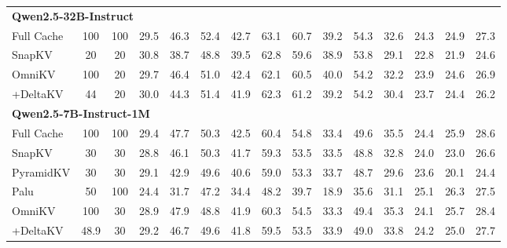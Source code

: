 \begin{table}[t]
{\begin{tabular}{l cc cccc cccc cccc}
\midrule
\multicolumn{15}{l}{\textbf{Qwen2.5-32B-Instruct}} \\
Full Cache & 100 & 100 & 29.5 & 46.3 & 52.4 & 42.7 & 63.1 & 60.7 & 39.2 & 54.3 & 32.6 & 24.3 & 24.9 & 27.3 \\
SnapKV & 20 & 20 & 30.8 & 38.7 & 48.8 & 39.5 & 62.8 & 59.6 & 38.9 & 53.8 & 29.1 & 22.8 & 21.9 & 24.6 \\
OmniKV & 100 & 20 & 29.7 & 46.4 & 51.0 & 42.4 & 62.1 & 60.5 & 40.0 & 54.2 & 32.2 & 23.9 & 24.6 & 26.9 \\
\quad +DeltaKV & 44 & 20 & 30.0 & 44.3 & 51.4 & 41.9 & 62.3 & 61.2 & 39.2 & 54.2 & 30.4 & 23.7 & 24.4 & 26.2 \\
\midrule
\multicolumn{15}{l}{\textbf{Qwen2.5-7B-Instruct-1M}} \\
Full Cache & 100 & 100 & 29.4 & 47.7 & 50.3 & 42.5 & 60.4 & 54.8 & 33.4 & 49.6 & 35.5 & 24.4 & 25.9 & 28.6 \\
SnapKV & 30 & 30 & 28.8 & 46.1 & 50.3 & 41.7 & 59.3 & 53.5 & 33.5 & 48.8 & 32.8 & 24.0 & 23.0 & 26.6 \\
PyramidKV & 30 & 30 & 29.1 & 42.9 & 49.6 & 40.6 & 59.0 & 53.3 & 33.7 & 48.7 & 29.6 & 23.6 & 20.1 & 24.4 \\
Palu & 50 & 100 & 24.4 & 31.7 & 47.2 & 34.4 & 48.2 & 39.7 & 18.9 & 35.6 & 31.1 & 25.1 & 26.3 & 27.5 \\
OmniKV & 100 & 30 & 28.9 & 47.9 & 48.8 & 41.9 & 60.3 & 54.5 & 33.3 & 49.4 & 35.3 & 24.1 & 25.7 & 28.4 \\
\quad +DeltaKV & 48.9 & 30 & 29.2 & 46.7 & 49.6 & 41.8 & 59.5 & 53.5 & 33.9 & 49.0 & 33.8 & 24.2 & 25.0 & 27.7 \\
\bottomrule
\end{tabular}
}
\end{table}


